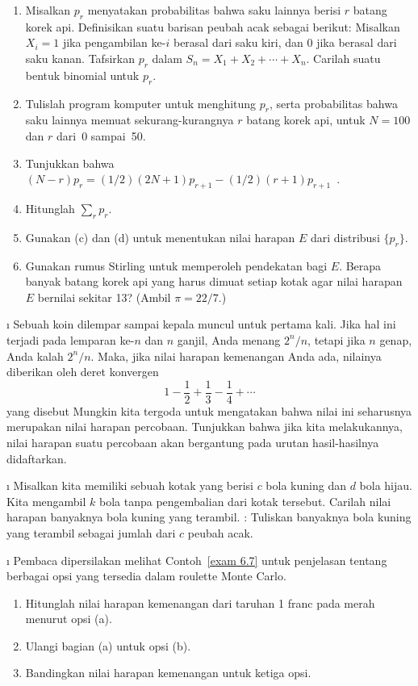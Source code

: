 \begin{LJSItem}
\begin{enumerate}
\item Misalkan $p_r$ menyatakan probabilitas bahwa saku lainnya berisi $r$ batang korek api.
Definisikan suatu barisan peubah acak  sebagai berikut: Misalkan
$X_i = 1$ jika pengambilan ke-$i$ berasal dari saku kiri, dan 0 jika berasal dari saku kanan.
Tafsirkan $p_r$ dalam $S_n = X_1 + X_2 +\cdots+ X_n$. Carilah suatu bentuk
binomial untuk $p_r$.

\item Tulislah program komputer untuk menghitung $p_r$, serta probabilitas bahwa
saku lainnya memuat sekurang-kurangnya $r$ batang korek api, untuk $N = 100$ dan $r$ dari~0 sampai~50.

\item Tunjukkan bahwa $(N - r)p_r = (1/2)(2N + 1)p_{r + 1} - (1/2)(r + 1)p_{r + 1}$\ .

\item Hitunglah $\sum_r p_r$.

\item Gunakan (c) dan (d) untuk menentukan nilai harapan $E$ dari distribusi
$\{p_r\}$.

\item Gunakan rumus Stirling untuk memperoleh pendekatan bagi $E$. Berapa banyak batang korek api
yang harus dimuat setiap kotak agar nilai harapan $E$ bernilai sekitar 13?
(Ambil $\pi = 22/7$.)
\end{enumerate}

\i\label{exer 6.1.35} Sebuah koin dilempar sampai kepala muncul untuk pertama kali. Jika
hal ini terjadi pada lemparan ke-$n$ dan $n$ ganjil, Anda menang $2^n/n$, tetapi jika $n$ genap,
Anda kalah
$2^n/n$. Maka, jika nilai harapan kemenangan Anda ada, nilainya diberikan oleh deret konvergen
$$ 1 - \frac 12 + \frac 13 - \frac 14 +\cdots
$$ yang disebut  Mungkin kita tergoda untuk mengatakan bahwa nilai ini
seharusnya merupakan nilai harapan percobaan. Tunjukkan bahwa jika kita melakukannya,
nilai harapan suatu percobaan akan bergantung pada urutan hasil-hasilnya
didaftarkan.

\i\label{exer 6.1.37} Misalkan kita memiliki sebuah kotak yang berisi $c$
bola kuning dan $d$ bola hijau. Kita mengambil $k$ bola tanpa pengembalian
dari kotak tersebut. Carilah nilai harapan banyaknya bola kuning yang terambil. : Tuliskan
banyaknya bola kuning yang terambil sebagai jumlah dari $c$ peubah acak.

\i\label{exer 6.1.38} Pembaca dipersilakan melihat Contoh~\ref{exam 6.7} untuk penjelasan
tentang berbagai opsi yang tersedia dalam roulette Monte Carlo.
\begin{enumerate}
\item Hitunglah nilai harapan kemenangan dari taruhan 1 franc pada merah menurut opsi (a).
\item Ulangi bagian (a) untuk opsi (b).
\item Bandingkan nilai harapan kemenangan untuk ketiga opsi.
\end{enumerate}


\end{LJSItem}

